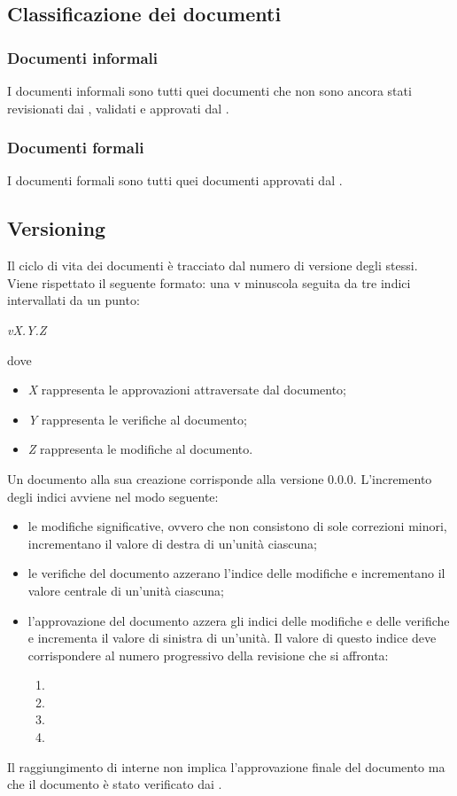\subsection{Classificazione dei documenti}
\subsubsection{Documenti informali}
I documenti informali sono tutti quei documenti che non sono ancora stati revisionati dai \Verificatori{}, validati e approvati dal \Responsabile{}.

\subsubsection{Documenti formali}
I documenti formali sono tutti quei documenti approvati dal \Responsabile{}.

\subsection{Versioning}
Il ciclo di vita dei documenti è tracciato dal numero di versione degli stessi.\\
Viene rispettato il seguente formato: una v minuscola seguita da tre indici intervallati da un punto:
\begin{center}
	\textit{vX.Y.Z}
\end{center}
dove
\begin{itemize}
	\item \textit{X} rappresenta le approvazioni attraversate dal documento;
	\item \textit{Y} rappresenta le verifiche al documento;
	\item \textit{Z} rappresenta le modifiche al documento.
\end{itemize}
Un documento alla sua creazione corrisponde alla versione 0.0.0. L’incremento degli indici avviene nel modo seguente:
\begin{itemize}
	\item le modifiche significative, ovvero che non consistono di sole correzioni minori, incrementano il valore di destra di un'unità ciascuna;
	\item le verifiche del documento azzerano l'indice delle modifiche e incrementano il valore centrale di un'unità ciascuna;
	\item l'approvazione del documento azzera gli indici delle modifiche e delle verifiche e incrementa il valore di sinistra di un'unità. Il valore di questo indice deve corrispondere al numero progressivo della revisione che si affronta:
	\begin{enumerate}
		\item \RR
		\item \RP
		\item \RQ
		\item \RA
	\end{enumerate} 
\end{itemize}
Il raggiungimento di  interne non implica l'approvazione finale del documento ma che il documento è stato verificato dai \Verificatori{}.

